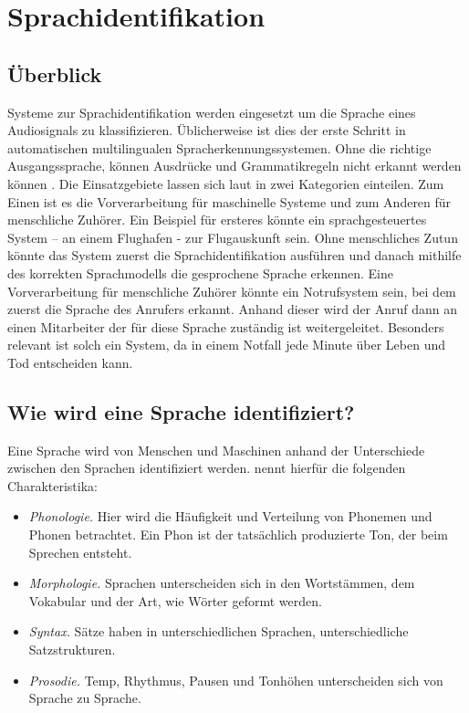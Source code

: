 \section{Sprachidentifikation}
\subsection{Überblick}
Systeme zur Sprachidentifikation werden eingesetzt um die Sprache eines Audiosignals zu klassifizieren. Üblicherweise ist dies der erste Schritt in automatischen multilingualen Spracherkennungssystemen.
Ohne die richtige Ausgangssprache, können Ausdrücke und Grammatikregeln nicht erkannt werden können \cite{Bartz.2017}.
Die Einsatzgebiete lassen sich laut \cite{Zissman.2001} in zwei Kategorien einteilen. Zum Einen ist es die Vorverarbeitung für maschinelle Systeme und zum Anderen für menschliche Zuhörer. Ein Beispiel für ersteres könnte ein sprachgesteuertes System – an einem Flughafen - zur Flugauskunft sein. Ohne menschliches Zutun könnte das System zuerst die Sprachidentifikation ausführen und danach mithilfe des korrekten Sprachmodells die gesprochene Sprache erkennen.
Eine Vorverarbeitung für menschliche Zuhörer könnte ein Notrufsystem sein, bei dem zuerst die Sprache des Anrufers erkannt. Anhand dieser wird der Anruf dann an einen Mitarbeiter der für diese Sprache zuständig ist weitergeleitet. Besonders relevant ist solch ein System, da in einem Notfall jede Minute über Leben und Tod entscheiden kann.

\subsection{Wie wird eine Sprache identifiziert?}
Eine Sprache wird von Menschen und Maschinen anhand der Unterschiede zwischen den Sprachen identifiziert werden. \cite{Zissman.2001} nennt hierfür die folgenden Charakteristika:
\begin{itemize}
\item \textit{Phonologie.} Hier wird die Häufigkeit und Verteilung von Phonemen und Phonen betrachtet. Ein Phon ist der tatsächlich produzierte Ton, der beim Sprechen entsteht.
\item \textit{Morphologie.} Sprachen unterscheiden sich in den Wortstämmen, dem Vokabular und der Art, wie Wörter geformt werden.
\item \textit{Syntax.} Sätze haben in unterschiedlichen Sprachen, unterschiedliche Satzstrukturen.
\item \textit{Prosodie.} Temp, Rhythmus, Pausen und Tonhöhen unterscheiden sich von Sprache zu Sprache.
\end{itemize}

